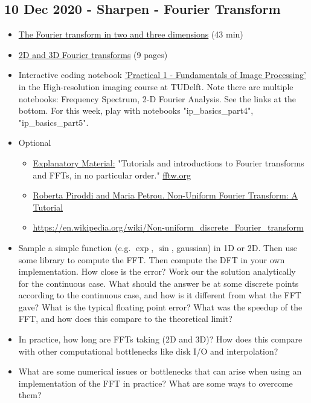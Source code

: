 \documentclass[11pt, oneside]{article}   	%
\begin{document}
\subsection{10 Dec 2020 - Sharpen - Fourier Transform}
\begin{itemize}
\item \href{https://youtu.be/J1ViNmmQnd0}{The Fourier transform in two and three dimensions} (43 min)
	\item \href{https://cryoemprinciples.yale.edu/sites/default/files/files/4%20Fourier2D-3D.pdf}{2D and 3D Fourier transforms} (9 pages)
	\item Interactive coding notebook \href{https://gitlab.tudelft.nl/aj-lab/teaching/-/wikis/NB4020}{'Practical 1 - Fundamentals of Image Processing'} in the High-resolution imaging course at TUDelft. Note there are multiple notebooks: Frequency Spectrum, 2-D Fourier Analysis. See the links at the bottom. For this week, play with notebooks "ip\_basics\_part4", "ip\_basics\_part5".
	\item Optional
	\begin{itemize}
		\item \href{http://www.fftw.org/links.html}{Explanatory Material:} "Tutorials and introductions to Fourier transforms and FFTs, in no particular order." \url{fftw.org}
		\item \href{http://homepages.inf.ed.ac.uk/rbf/CVonline/LOCAL_COPIES/PIRODDI1/NUFT/NUFT.html}{Roberta Piroddi and Maria Petrou. Non-Uniform Fourier Transform: A Tutorial}
		\item \url{https://en.wikipedia.org/wiki/Non-uniform_discrete_Fourier_transform}
	\end{itemize}
\end{itemize}

\begin{itemize}
	\item Sample a simple function (e.g. $\exp$, $\sin$, gaussian) in 1D or 2D. Then use some library to compute the FFT. Then compute the DFT in your own implementation. How close is the error? Work our the solution analytically for the continuous case. What should the answer be at some discrete points according to the continuous case, and how is it different from what the FFT gave? What is the typical floating point error? What was the speedup of the FFT, and how does this compare to the theoretical limit?
	\item In practice, how long are FFTs taking (2D and 3D)? How does this compare with other computational bottlenecks like disk I/O and interpolation?
	\item What are some numerical issues or bottlenecks that can arise when using an implementation of the FFT in practice? What are some ways to overcome them?
\end{itemize}
\end{document}
